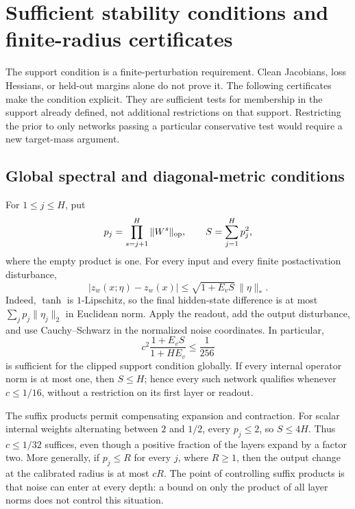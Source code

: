 \section{Sufficient stability conditions and finite-radius certificates}
\label{sec:standalone-stability-certificates}

The support condition is a finite-perturbation requirement. Clean
Jacobians, loss Hessians, or held-out margins alone do not prove it.
The following certificates make the condition explicit. They are
sufficient tests for membership in the support already defined, not
additional restrictions on that support. Restricting the prior to only
networks passing a particular conservative test would require a new
target-mass argument.

\subsection{Global spectral and diagonal-metric conditions}

For $1\le j\le H$, put
\[
 p_j=\prod_{s=j+1}^H\|W^s\|_{\rm op},\qquad S=\sum_{j=1}^H p_j^2,
\]
where the empty product is one. For every input and every finite
postactivation disturbance,
\begin{equation}\label{eq:standalone-spectral-certificate}
 |z_w(x;\eta)-z_w(x)|
 \le \sqrt{1+E_vS}\,\|\eta\|_*.
\end{equation}
Indeed, $\tanh$ is $1$-Lipschitz, so the final hidden-state difference
is at most $\sum_jp_j\|\eta_j\|_2$ in Euclidean norm. Apply the readout,
add the output disturbance, and use Cauchy--Schwarz in the normalized
noise coordinates. In particular,
\begin{equation}\label{eq:standalone-spectral-condition}
 c^2\frac{1+E_v S}{1+H E_v}\le\frac1{256}
\end{equation}
is sufficient for the clipped support condition globally. If every
internal operator norm is at most one, then $S\le H$; hence every such
network qualifies whenever $c\le1/16$, without a restriction on its
first layer or readout.

The suffix products permit compensating expansion and contraction.
For scalar internal weights alternating between $2$ and $1/2$, every
$p_j\le2$, so $S\le4H$. Thus $c\le1/32$ suffices, even though a
positive fraction of the layers expand by a factor two. More generally,
if $p_j\le R$ for every $j$, where $R\ge1$, then the output change
at the calibrated radius is at most $cR$. The point of controlling
suffix products is that noise can enter at every depth: a bound on only
the product of all layer norms does not control this situation.

